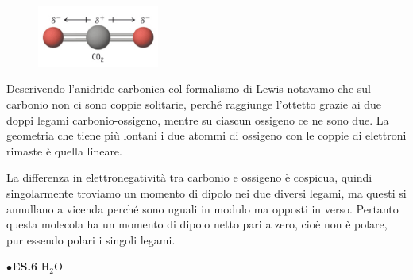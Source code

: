 \hspace{0.5cm}\begin{minipage}{0.2\textwidth}
    \begin{figure}[H]
    \includegraphics[width=4cm]{immagini/CO_2.png}
    \end{figure}
    \end{minipage} \hfill
    \begin{minipage}{0.65\textwidth}
    \vspace{0.4cm}Descrivendo l'anidride carbonica col formalismo di Lewis notavamo che sul carbonio non ci sono coppie solitarie, perché raggiunge l'ottetto grazie ai due doppi legami carbonio-ossigeno, mentre su ciascun ossigeno ce ne sono due. La geometria che tiene più lontani i due atommi di ossigeno con le coppie di elettroni rimaste è quella lineare.
    
    La differenza in elettronegatività tra carbonio e ossigeno è cospicua, quindi singolarmente troviamo un momento di dipolo nei due diversi legami, ma questi si annullano a vicenda perché sono uguali in modulo ma opposti in verso. Pertanto questa molecola ha un momento di dipolo netto pari a zero, cioè non è polare, pur essendo polari i singoli legami.
    \end{minipage}

\vspace{0.2cm}$\bullet$\textbf{ES.6} H$_2$O

